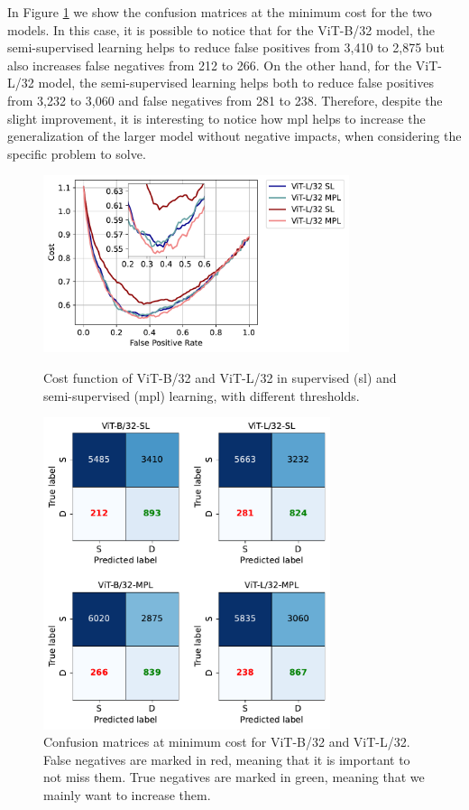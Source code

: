 In Figure \ref{fig:confusion_matrix_min_cost} we show the confusion matrices 
at the minimum cost for the two models. In this case, it is possible to notice 
that for the ViT-B/32 model, the semi-supervised learning helps to reduce false 
positives from 3,410 to 2,875 but also increases false negatives from 212 to 
266. On the other hand, for the ViT-L/32 model, the semi-supervised learning 
helps both to reduce false positives from 3,232 to 3,060 and false negatives 
from 281 to 238. Therefore, despite the slight improvement, it is interesting to 
notice how \acl{mpl} helps to increase the generalization of the larger model 
without negative impacts, when considering the specific problem to solve.
\begin{figure}[p]
    \centering
    \includegraphics[width=0.8\textwidth]{images/bdd100k/training/cost.pdf}
    \caption[Cost function of ViT-B/32 and ViT-L/32]
    {Cost function of ViT-B/32 and ViT-L/32 in supervised (\acs{sl}) and semi-supervised 
    (\acs{mpl}) learning, with different thresholds.}
    \label{fig:cost_roc}
    \vspace{1cm}
    \includegraphics[width=0.75\textwidth]{images/bdd100k/training/confusion-matrix_min_cost.pdf}
    \caption[Confusion matrices at minimum cost]
    {Confusion matrices at minimum cost for ViT-B/32 and ViT-L/32.
    False negatives are marked in red, meaning that it is important to not miss 
    them. True negatives are marked in green, meaning that we mainly want to 
    increase them.}
    \label{fig:confusion_matrix_min_cost}
\end{figure}

